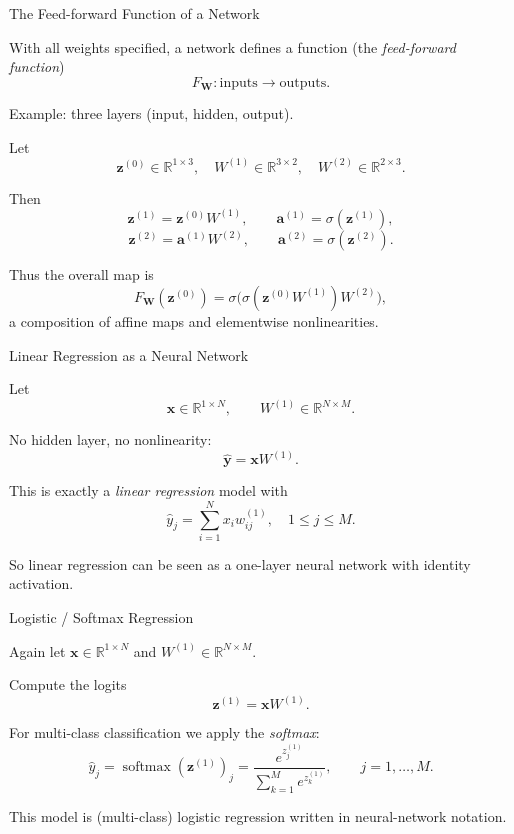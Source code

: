 \documentclass[aspectratio=169]{beamer}
\begin{document}
\begin{frame}{The Feed-forward Function of a Network}

With all weights specified, a network defines a function
(the \emph{feed-forward function})
\[
  F_{\bm{W}} : \text{inputs} \longrightarrow \text{outputs}.
\]

Example: three layers (input, hidden, output).

\medskip
Let
\[
  \bm{z}^{(0)} \in \mathbb{R}^{1\times 3},\quad
  W^{(1)} \in \mathbb{R}^{3\times 2},\quad
  W^{(2)} \in \mathbb{R}^{2\times 3}.
\]

Then
\[
  \bm{z}^{(1)} = \bm{z}^{(0)} W^{(1)}, \qquad
  \bm{a}^{(1)} = \sigma(\bm{z}^{(1)}),
\]
\[
  \bm{z}^{(2)} = \bm{a}^{(1)} W^{(2)}, \qquad
  \bm{a}^{(2)} = \sigma(\bm{z}^{(2)}).
\]

Thus the overall map is
\[
  F_{\bm{W}}(\bm{z}^{(0)}) = \sigma\!\bigl(\sigma(\bm{z}^{(0)} W^{(1)}) W^{(2)}\bigr),
\]
a composition of affine maps and elementwise nonlinearities.

\end{frame}

\begin{frame}{Linear Regression as a Neural Network}

Let
\[
  \bm{x} \in \mathbb{R}^{1\times N},\qquad
  W^{(1)} \in \mathbb{R}^{N\times M}.
\]

No hidden layer, no nonlinearity:
\[
  \hat{\bm{y}} = \bm{x} W^{(1)}.
\]

This is exactly a \emph{linear regression} model with
\[
  \hat{y}_j = \sum_{i=1}^N x_i w^{(1)}_{ij},
  \quad 1 \le j \le M.
\]

So linear regression can be seen as a one-layer neural network with
identity activation.

\end{frame}

\begin{frame}{Logistic / Softmax Regression}

Again let $\bm{x} \in \mathbb{R}^{1\times N}$ and
$W^{(1)} \in \mathbb{R}^{N\times M}$.

Compute the logits
\[
  \bm{z}^{(1)} = \bm{x} W^{(1)}.
\]

For multi-class classification we apply the \emph{softmax}:
\[
  \hat{y}_j
   = \operatorname{softmax}(\bm{z}^{(1)})_j
   = \frac{e^{z^{(1)}_j}}{\sum_{k=1}^M e^{z^{(1)}_k}},
  \qquad j=1,\dots,M.
\]

This model is (multi-class) logistic regression written in neural-network
notation.

\end{frame}
\end{document}

